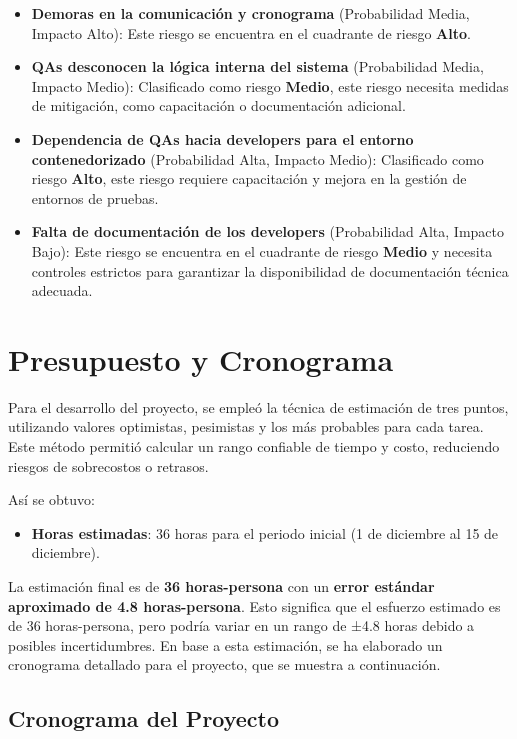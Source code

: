\documentclass[stu, 12pt, letterpaper, donotrepeattitle, floatsintext, natbib]{apa7}
\begin{document}
\begin{itemize}
    \item \textbf{Demoras en la comunicación y cronograma} (Probabilidad Media, Impacto Alto): Este riesgo se encuentra en el cuadrante de riesgo \textbf{Alto}.
    \item \textbf{QAs desconocen la lógica interna del sistema} (Probabilidad Media, Impacto Medio): Clasificado como riesgo \textbf{Medio}, este riesgo necesita medidas de mitigación, como capacitación o documentación adicional.
    \item \textbf{Dependencia de QAs hacia developers para el entorno contenedorizado} (Probabilidad Alta, Impacto Medio): Clasificado como riesgo \textbf{Alto}, este riesgo requiere capacitación y mejora en la gestión de entornos de pruebas.
    \item \textbf{Falta de documentación de los developers} (Probabilidad Alta, Impacto Bajo): Este riesgo se encuentra en el cuadrante de riesgo \textbf{Medio} y necesita controles estrictos para garantizar la disponibilidad de documentación técnica adecuada.
\end{itemize}

\section{\large Presupuesto y Cronograma}

Para el desarrollo del proyecto, se empleó la técnica de estimación de tres puntos, utilizando valores optimistas, pesimistas y los más probables para cada tarea. Este método permitió calcular un rango confiable de tiempo y costo, reduciendo riesgos de sobrecostos o retrasos.

Así se obtuvo:
\begin{itemize}
    \item \textbf{Horas estimadas}: 36 horas para el periodo inicial (1 de diciembre al 15 de diciembre).
\end{itemize}

La estimación final es de \textbf{36 horas-persona} con un \textbf{error estándar aproximado de 4.8 horas-persona}. Esto significa que el esfuerzo estimado es de 36 horas-persona, pero podría variar en un rango de ±4.8 horas debido a posibles incertidumbres. En base a esta estimación, se ha elaborado un cronograma detallado para el proyecto, que se muestra a continuación.

\subsection*{Cronograma del Proyecto}
\end{document}
